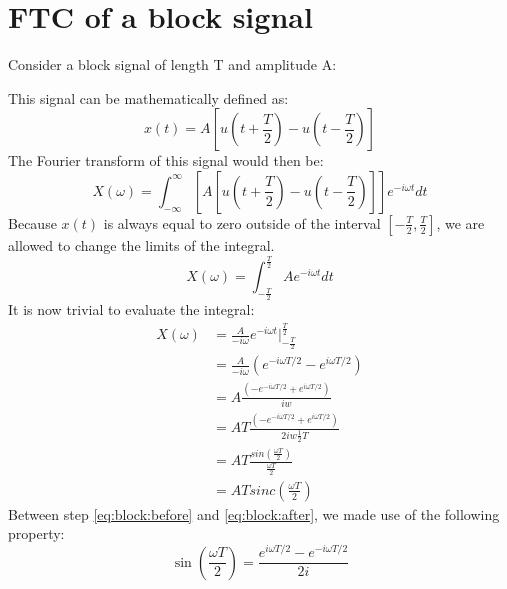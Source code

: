 \documentclass[]{subfiles}
\begin{document}
	\section{FTC of a block signal}
	Consider a block signal of length T and amplitude A:\\

	\begin{figure}[h]
		\centering
	\end{figure}
	This signal can be mathematically defined as:
	\begin{equation*}
		x(t) = A\left[ u(t+\frac{T}{2}) -u(t-\frac{T}{2})\right]
	\end{equation*}
	The Fourier transform of this signal would then be:
	\begin{equation*}
		X(\omega) = \int_{-\infty}^{\infty}\left[ A\left[ u(t+\frac{T}{2}) -u(t-\frac{T}{2})\right] \right]e^{-i\omega t}dt
	\end{equation*}
	Because $x(t)$ is always equal to zero outside of the interval $\left[ -\frac{T}{2},\frac{T}{2}\right] $, we are allowed to change the limits of the integral.
	\begin{equation*}
		X(\omega) = \int_{-\frac{T}{2}}^{\frac{T}{2}}A e^{-i\omega t}dt
	\end{equation*}
	It is now trivial to evaluate the integral:
	\begin{align}
		X(\omega)&=\frac{A}{-i\omega}e^{-i\omega t} \bigg\vert_{-\frac{T}{2}}^{\frac{T}{2}}\\
		&= \frac{A}{-i\omega}(e^{-i\omega T/2}-e^{i\omega T/2})\\
        &= {A}\frac{(-e^{-i\omega T/2}+e^{i\omega T/2})}{iw}\\
        \label{eq:block:before}
        &= {AT}\frac{(-e^{-i\omega T/2}+e^{i\omega T/2})}{2iw\frac{1}{2}T}\\
        \label{eq:block:after}
		&= {AT}\frac{sin(\frac{\omega T}{2})}{{\frac{\omega T}{2}}}\\
		&=ATsinc(\frac{\omega T}{2})
	\end{align}
	Between step \ref{eq:block:before} and \ref{eq:block:after}, we made use of the following property:
	\begin{equation*}
		\sin(\frac{\omega T}{2}) = \frac{e^{i\omega T/2}-e^{-i\omega T/2}}{2i}
	\end{equation*}
\end{document}
